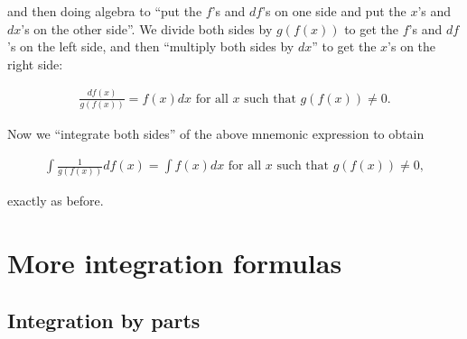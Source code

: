 and then doing algebra to ``put the $f$'s and $df$'s on one side and put the $x$'s and $dx$'s on the other side''. We divide both sides by $g(f(x))$ to get the $f$'s and $df$'s on the left side, and then ``multiply both sides by $dx$'' to get the $x$'s on the right side: 

\begin{align*}
    \frac{df(x)}{g(f(x))} = f(x) dx \text{ for all $x$ such that $g(f(x)) \neq 0$}.
\end{align*}

Now we ``integrate both sides'' of the above mnemonic expression to obtain

\begin{align*}
    \int \frac{1}{g(f(x))} df(x) = \int f(x) dx \text{ for all $x$ such that $g(f(x)) \neq 0$},
\end{align*}

exactly as before.

\section*{More integration formulas}

\subsection*{Integration by parts}

